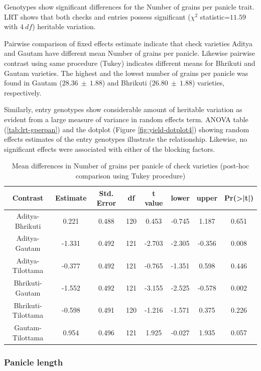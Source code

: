 \documentclass[12pt,oneside]{dukestatscithesis} %
\begin{document}
Genotypes show significant differences for the Number of grains per panicle trait. LRT shows that both checks and entries possess significant (\(\chi^2\) statistic=\(11.59\) with \(4\ df\)) heritable variation.

Pairwise comparison of fixed effects estimate indicate that check varieties Aditya and Gautam have different mean Number of grains per panicle. Likewise pairwise contrast using same procedure (Tukey) indicates different means for Bhrikuti and Gautam varieties. The highest and the lowest number of grains per panicle was found in Gautam (\(28.36\ \pm\ 1.88\)) and Bhrikuti (\(26.80\ \pm\ 1.88\)) varieties, respectively.

Similarly, entry genotypes show considerable amount of heritable variation as evident from a large measure of variance in random effects term. ANOVA table (\ref{tab:lrt-gperpan}) and the dotplot (Figure \ref{fig:yield-dotplot4}) showing random effects estimates of the entry genotypes illustrate the relationship. Likewise, no significant effects were associated with either of the blocking factors.
\begin{table}[H]

\caption{\label{tab:yield-meanconf-tab4}Mean differences in Number of grains per panicle of check varieties (post-hoc comparison using Tukey procedure)}
\centering
\begin{tabular}[t]{cccccccc}
\toprule
Contrast & Estimate & Std. Error & df & t value & lower & upper & Pr(>|t|)\\
\midrule
Aditya-Bhrikuti & 0.221 & 0.488 & 120 & 0.453 & -0.745 & 1.187 & 0.651\\
Aditya-Gautam & -1.331 & 0.492 & 121 & -2.703 & -2.305 & -0.356 & 0.008\\
Aditya-Tilottama & -0.377 & 0.492 & 121 & -0.765 & -1.351 & 0.598 & 0.446\\
Bhrikuti-Gautam & -1.552 & 0.492 & 121 & -3.155 & -2.525 & -0.578 & 0.002\\
Bhrikuti-Tilottama & -0.598 & 0.491 & 120 & -1.216 & -1.571 & 0.375 & 0.226\\
Gautam-Tilottama & 0.954 & 0.496 & 121 & 1.925 & -0.027 & 1.935 & 0.057\\
\bottomrule
\end{tabular}
\end{table}
\hypertarget{panicle-length}{%
\subsubsection{Panicle length}\label{panicle-length}}
\end{document}
